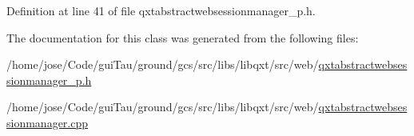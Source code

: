 Definition at line 41 of file qxtabstractwebsessionmanager\-\_\-p.\-h.



The documentation for this class was generated from the following files\-:\begin{DoxyCompactItemize}
\item 
/home/jose/\-Code/gui\-Tau/ground/gcs/src/libs/libqxt/src/web/\hyperlink{qxtabstractwebsessionmanager__p_8h}{qxtabstractwebsessionmanager\-\_\-p.\-h}\item 
/home/jose/\-Code/gui\-Tau/ground/gcs/src/libs/libqxt/src/web/\hyperlink{qxtabstractwebsessionmanager_8cpp}{qxtabstractwebsessionmanager.\-cpp}\end{DoxyCompactItemize}
